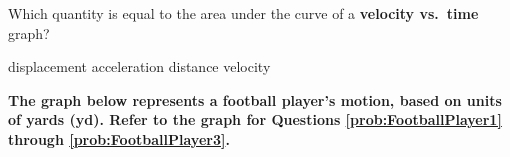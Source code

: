 \documentclass[]{exam}
\theoremstyle{definition}
\begin{document}
\begin{questions}
















% 

\question
Which quantity is equal to the area under the curve of a \textbf{velocity vs.~time} graph?
\begin{choices}
\correctchoice displacement
\choice acceleration
\choice distance
\choice velocity
\end{choices}





\begin{EnvUplevel}
\textbf{The graph below represents a football player's motion, based on units of yards (yd). Refer to the graph for Questions \ref{prob:FootballPlayer1} through \ref{prob:FootballPlayer3}.}
\end{EnvUplevel}

\begin{figure}[h!]
    \centering
    \label{fig:my_label}
\end{figure}


\end{questions}
\end{document}
